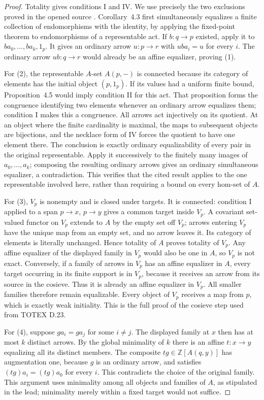 \begin{proof}
Totality gives conditions I and IV. We use precisely the two exclusions
proved in the opened source \cite[Corollary~4.3 and Proposition~4.5]{IsbellMitchell1976}.
Corollary~4.3 first simultaneously equalizes a finite collection of
endomorphisms with the identity, by applying the fixed-point theorem to
endomorphisms of a representable act. If $b:q\to p$ existed, apply it to
$ba_0,\ldots,ba_k,1_p$. It gives an ordinary arrow $u:p\to r$ with
$uba_i=u$ for every $i$. The ordinary arrow $ub:q\to r$ would already
be an affine equalizer, proving (1).

For (2), the representable $A$-set $A(p,-)$ is connected because its
category of elements has the initial object $(p,1_p)$. If its values had
a uniform finite bound, Proposition~4.5 would imply condition II for this
act. That proposition forms the congruence identifying two elements
whenever an ordinary arrow equalizes them; condition I makes this a
congruence. All arrows act injectively on its quotient. At an object
where the finite cardinality is maximal, the maps to subsequent objects
are bijections, and the necklace form of IV forces the quotient to have
one element there. The conclusion is exactly ordinary equalizability
of every pair in the original representable. Apply it successively to
the finitely many images of $a_0,\ldots,a_k$; composing the resulting
ordinary arrows gives an ordinary simultaneous equalizer, a
contradiction. This verifies that the cited result applies to the one
representable involved here, rather than requiring a bound on every
hom-set of $A$.

For (3), $V_p$ is nonempty and is closed under targets. It is connected:
condition I applied to a span $p\to x$, $p\to y$ gives a common target
inside $V_p$. A covariant set-valued functor on $V_p$ extends to $A$ by
the empty set off $V_p$; arrows entering $V_p$ have the unique map from
an empty set, and no arrow leaves it. Its category of elements is
literally unchanged. Hence totality of $A$ proves totality of $V_p$.
Any affine equalizer of the displayed family in $V_p$ would also be one
in $A$, so $V_p$ is not exact. Conversely, if a family of arrows in
$V_p$ has an affine equalizer in $A$, every target occurring in its
finite support is in $V_p$, because it receives an arrow from its source
in the cosieve. Thus it is already an affine equalizer in $V_p$.
All smaller families therefore remain equalizable. Every object of
$V_p$ receives a map from $p$, which is exactly weak initiality.
This is the full proof of the cosieve step used from TOTEX D.23.

For (4), suppose $ga_i=ga_j$ for some $i\ne j$. The displayed family at
$x$ then has at most $k$ distinct arrows. By the global minimality of
$k$ there is an affine $t:x\to y$ equalizing all its distinct members.
The composite $tg\in\mathbb Z[A(q,y)]$ has augmentation one, because
$g$ is an ordinary arrow, and satisfies $(tg)a_i=(tg)a_0$ for every
$i$. This contradicts the choice of the original family. This argument
uses minimality among all objects and families of $A$, as stipulated in
the lead; minimality merely within a fixed target would not suffice.
\end{proof}
